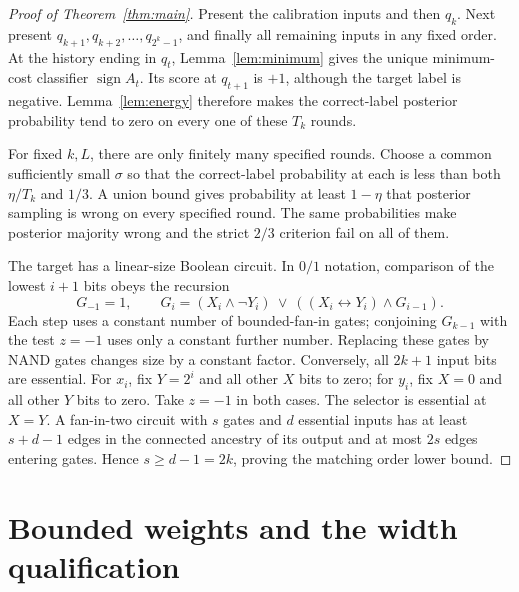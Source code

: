\documentclass[11pt]{article}
\theoremstyle{remark}\newtheorem{remark}[theorem]{Remark}
\newcommand{\sgn}{\operatorname{sign}}
\begin{document}
\begin{proof}[Proof of Theorem~\ref{thm:main}]
Present the calibration inputs and then $q_k$. Next present
$q_{k+1},q_{k+2},\ldots,q_{2^k-1}$, and finally all remaining inputs in
any fixed order. At the history ending in $q_t$, Lemma~\ref{lem:minimum}
gives the unique minimum-cost classifier $\sgn A_t$.
Its score at $q_{t+1}$ is $+1$, although the target label is negative.
Lemma~\ref{lem:energy} therefore makes the correct-label posterior
probability tend to zero on every one of these $T_k$ rounds.

For fixed $k,L$, there are only finitely many specified rounds.
Choose a common sufficiently small $\sigma$ so that the correct-label
probability at each is less than both $\eta/T_k$ and $1/3$.
A union bound gives probability at least $1-\eta$ that posterior sampling
is wrong on every specified round. The same probabilities make posterior
majority wrong and the strict $2/3$ criterion fail on all of them.

The target has a linear-size Boolean circuit. In $0/1$ notation,
comparison of the lowest $i+1$ bits obeys the recursion
\[
 G_{-1}=1,\qquad
 G_i=(X_i\wedge\neg Y_i)\ \vee\
           ((X_i\leftrightarrow Y_i)\wedge G_{i-1}).
\]
Each step uses a constant number of bounded-fan-in gates; conjoining
$G_{k-1}$ with the test $z=-1$ uses only a constant further number.
Replacing these gates by NAND gates changes size by a constant factor.
Conversely, all $2k+1$ input bits are essential. For $x_i$, fix $Y=2^i$
and all other $X$ bits to zero; for $y_i$, fix $X=0$ and all other $Y$
bits to zero. Take $z=-1$ in both cases. The selector is essential at
$X=Y$. A fan-in-two circuit with $s$ gates and $d$ essential inputs has
at least $s+d-1$ edges in the connected ancestry of its output and at
most $2s$ edges entering gates. Hence $s\ge d-1=2k$, proving the
matching order lower bound.
\end{proof}

\section{Bounded weights and the width qualification}
\end{document}
